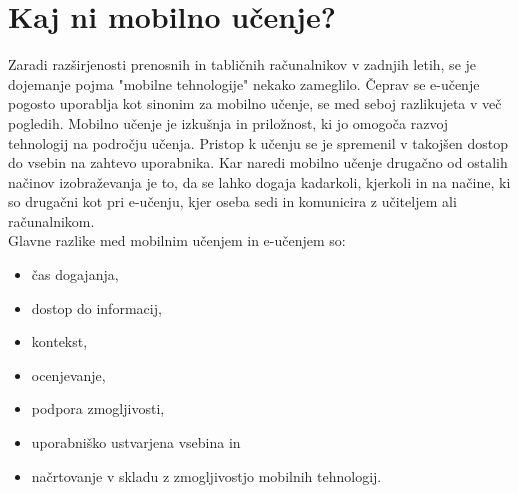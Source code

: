 \documentclass[a4paper, 12pt]{book}
\begin{document}
\section{Kaj ni mobilno učenje?}
\label{2.1}
Zaradi razširjenosti prenosnih in tabličnih računalnikov v  zadnjih letih, se je dojemanje pojma "mobilne tehnologije" nekako zameglilo. Čeprav se e-učenje pogosto uporablja kot sinonim za mobilno učenje, se med seboj razlikujeta v več pogledih. Mobilno učenje je izkušnja in priložnost, ki jo omogoča razvoj tehnologij na področju učenja. Pristop k učenju se je spremenil v takojšen dostop do vsebin na zahtevo uporabnika. Kar naredi mobilno učenje drugačno od ostalih načinov izobraževanja je to, da se lahko dogaja kadarkoli, kjerkoli in na načine, ki so drugačni kot pri e-učenju, kjer oseba sedi in komunicira z učiteljem ali računalnikom.\\ Glavne razlike med mobilnim učenjem in e-učenjem so:
\begin{itemize}
\item čas dogajanja,
\item dostop do informacij,
\item kontekst,
\item ocenjevanje,
\item podpora zmogljivosti,
\item uporabniško ustvarjena vsebina in
\item načrtovanje v skladu z zmogljivostjo mobilnih tehnologij.
\end{itemize}
\end{document}
